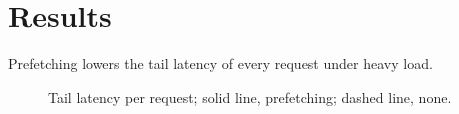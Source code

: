 \section{Results}
Prefetching lowers the tail latency of every request under heavy load.
\begin{figure}
\caption{Tail latency per request; solid line, prefetching; dashed line, none.}
\end{figure}
